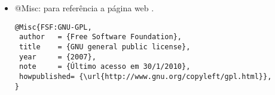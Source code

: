 \begin{itemize}
\item @Misc: para referência a página web \citep{FSF:GNU-GPL}.
{\scriptsize\begin{verbatim}
@Misc{FSF:GNU-GPL,
 author   = {Free Software Foundation},
 title    = {GNU general public license},
 year     = {2007},
 note     = {Último acesso em 30/1/2010},
 howpublished= {\url{http://www.gnu.org/copyleft/gpl.html}},
}
\end{verbatim}}

\end{itemize}

